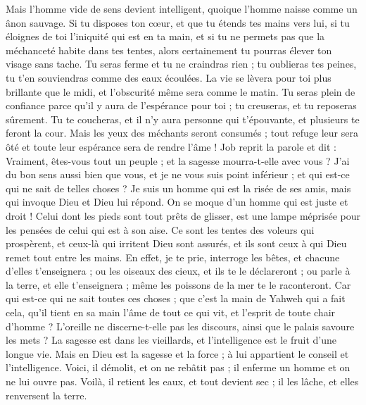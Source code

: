\begin{multicols}{2}
Mais l'homme vide de sens devient intelligent, quoique l'homme naisse comme un ânon sauvage.
Si tu disposes ton cœur, et que tu étends tes mains vers lui,
si tu éloignes de toi l'iniquité qui est en ta main, et si tu ne permets pas que la méchanceté habite dans tes tentes, 
alors certainement tu pourras élever ton visage sans tache. Tu seras ferme et tu ne craindras rien ;
tu oublieras tes peines, tu t'en souviendras comme des eaux écoulées.
La vie se lèvera pour toi plus brillante que le midi, et l'obscurité même sera comme le matin.
 Tu seras plein de confiance parce qu'il y aura de l'espérance pour toi ; tu creuseras, et tu reposeras sûrement.
Tu te coucheras, et il n'y aura personne qui t'épouvante, et plusieurs te feront la cour. 
Mais les yeux des méchants seront consumés ; tout refuge leur sera ôté et toute leur espérance sera de rendre l'âme !
\VerseOne{}Job reprit la parole et dit :
Vraiment, êtes-vous tout un peuple ; et la sagesse mourra-t-elle avec vous ?
J'ai du bon sens aussi bien que vous, et je ne vous suis point inférieur ; et qui est-ce qui ne sait de telles choses ?
Je suis un homme qui est la risée de ses amis, mais qui invoque Dieu et Dieu lui répond. On se moque d'un homme qui est juste et droit !
 Celui dont les pieds sont tout prêts de glisser, est une lampe méprisée pour les pensées de celui qui est à son aise. 
Ce sont les tentes des voleurs qui prospèrent, et ceux-là qui irritent Dieu sont assurés, et ils sont ceux à qui Dieu remet tout entre les mains.
En effet, je te prie, interroge les bêtes, et chacune d'elles t'enseignera ; ou les oiseaux des cieux, et ils te le déclareront ;
ou parle à la terre, et elle t'enseignera ; même les poissons de la mer te le raconteront. 
Car qui est-ce qui ne sait toutes ces choses ; que c'est la main de Yahweh qui a fait cela, 
qu'il tient en sa main l'âme de tout ce qui vit, et l'esprit de toute chair d'homme ?
L'oreille ne discerne-t-elle pas les discours, ainsi que le palais savoure les mets ?
La sagesse est dans les vieillards, et l'intelligence est le fruit d'une longue vie.
Mais en Dieu est la sagesse et la force ; à lui appartient le conseil et l'intelligence.
Voici, il démolit, et on ne rebâtit pas ; il enferme un homme et on ne lui ouvre pas.
Voilà, il retient les eaux, et tout devient sec ; il les lâche, et elles renversent la terre.

\end{multicols}

